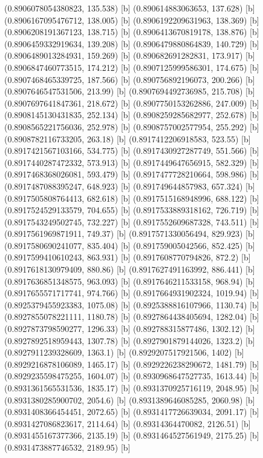 {{{(0.8906078054380823, 135.538) [b] 
(0.890614883063653, 137.628) [b] 
(0.8906167095476712, 138.005) [b] 
(0.8906192209631963, 138.369) [b] 
(0.8906208191367123, 138.715) [b] 
(0.8906413670819178, 138.876) [b] 
(0.8906459332919634, 139.208) [b] 
(0.8906479880864839, 140.729) [b] 
(0.8906489013284931, 159.269) [b] 
(0.890682691282831, 173.917) [b] 
(0.8906847460773515, 174.212) [b] 
(0.8907125999586301, 174.675) [b] 
(0.8907468465339725, 187.566) [b] 
(0.890756892196073, 200.266) [b] 
(0.8907646547531506, 213.99) [b] 
(0.8907694492736985, 215.708) [b] 
(0.8907697641847361, 218.672) [b] 
(0.8907750153262886, 247.009) [b] 
(0.8908145130431835, 252.134) [b] 
(0.8908259285682977, 252.678) [b] 
(0.8908565221756036, 252.978) [b] 
(0.8908757002577954, 255.292) [b] 
(0.8908782116733205, 263.18) [b] 
(0.8917412206918583, 523.55) [b] 
(0.8917421567103166, 534.775) [b] 
(0.8917430927287749, 551.566) [b] 
(0.8917440287472332, 573.913) [b] 
(0.8917449647656915, 582.329) [b] 
(0.8917468368026081, 593.479) [b] 
(0.8917477728210664, 598.986) [b] 
(0.8917487088395247, 648.923) [b] 
(0.891749644857983, 657.324) [b] 
(0.8917505808764413, 682.618) [b] 
(0.8917515168948996, 688.122) [b] 
(0.8917524529133579, 704.655) [b] 
(0.8917533889318162, 726.719) [b] 
(0.8917543249502745, 732.227) [b] 
(0.8917552609687328, 743.511) [b] 
(0.8917561969871911, 749.37) [b] 
(0.8917571330056494, 829.923) [b] 
(0.8917580690241077, 835.404) [b] 
(0.891759005042566, 852.425) [b] 
(0.8917599410610243, 863.931) [b] 
(0.8917608770794826, 872.2) [b] 
(0.8917618130979409, 880.86) [b] 
(0.8917627491163992, 886.441) [b] 
(0.8917636851348575, 963.093) [b] 
(0.8917646211533158, 968.94) [b] 
(0.8917655571717741, 974.766) [b] 
(0.8917664931902324, 1019.94) [b] 
(0.8925379455923383, 1075.08) [b] 
(0.8925388816107966, 1130.74) [b] 
(0.8927855078221111, 1180.78) [b] 
(0.8927864438405694, 1282.04) [b] 
(0.8927873798590277, 1296.33) [b] 
(0.892788315877486, 1302.12) [b] 
(0.8927892518959443, 1307.78) [b] 
(0.8927901879144026, 1323.2) [b] 
(0.8927911239328609, 1363.1) [b] 
(0.8929207517921506, 1402) [b] 
(0.8929216878106089, 1465.17) [b] 
(0.8929226238290672, 1481.79) [b] 
(0.8929235598475255, 1604.07) [b] 
(0.8930968647527735, 1613.44) [b] 
(0.8931361565531536, 1835.17) [b] 
(0.8931370925716119, 2048.95) [b] 
(0.8931380285900702, 2054.6) [b] 
(0.8931389646085285, 2060.98) [b] 
(0.8931408366454451, 2072.65) [b] 
(0.8931417726639034, 2091.17) [b] 
(0.8931427086823617, 2114.64) [b] 
(0.89314364470082, 2126.51) [b] 
(0.8931455167377366, 2135.19) [b] 
(0.8931464527561949, 2175.25) [b] 
(0.8931473887746532, 2189.95) [b] 
}}}

